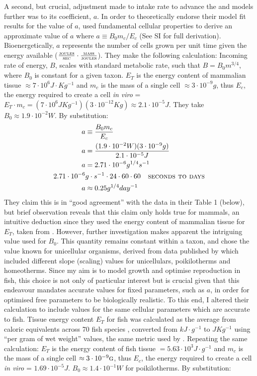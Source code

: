 \documentclass[a4paper]{article} %
\begin{document}
A second, but crucial, adjustment made to intake rate to advance the \cite{West2001} and \cite{Charnov2001} models further was to its coefficient, $a$. In order to theoretically endorse their model fit results for the value of $a$, \cite{West2001} used fundamental cellular properties to derive an approximate value of $a$ where $a \equiv B_{0}m_{c}/E_{c}$ (See SI for full derivation). Bioenergetically, $a$ represents the number of cells grown per unit time given the energy available ($\frac{\textsc{joules}}{\textsc{sec}} \cdot \frac{\textsc{mass}}{\textsc{joules}}$). They make the following calculation: Incoming rate of energy, $B$, scales with standard metabolic rate, such that $B = B_{0}m^{3/4}$, where $B_0$ is constant for a given taxon. $E_T$ is the energy content of mammalian tissue $\approx 7 \cdot 10^6 J \cdot Kg^{-1}$ and $m_c$ is the mass of a single cell $\approx 3 \cdot 10^{-9} g$, thus $E_c$, the energy required to create a cell \textit{in viro} = $E_T \cdot m_c = (7 \cdot 10^6 JKg^{-1})(3 \cdot 10^{-12} Kg) \approx 2.1 \cdot 10^{-5} J$. They take  $B_0 \approx 1.9 \cdot 10^{-2} W$. By substitution:
\begin{align*}
    a &\equiv \frac{B_{0}m_{c}}{E_{c}} \\
    a &= \frac{(1.9 \cdot 10^{-2} W)(3 \cdot 10^{-9} g)}{2.1 \cdot 10^{-5} J}\\
    a &= 2.71 \cdot 10^{-6} g^{1/4}s^{-1} \\
    2.71 \cdot 10^{-6}&g\cdot s^{-1} \cdot 24 \cdot 60 \cdot 60 \ \ \textsc{   seconds to days}\\
    a &\approx 0.25 g^{1/4}day^{-1}
\end{align*}
They claim this is in ``good agreement'' with the data in their Table 1 (below), but brief observation reveals that this claim only holds true for mammals, an intuitive deduction since they used the energy content of mammalian tissue for $E_T$, taken from \cite{peters1983}. However, further investigation makes apparent the intriguing value used for $B_0$. This quantity remains constant within a taxon, and \cite{West2001} chose the value known for unicellular organisms, derived from data published by \cite{Hemmingsen1960} which included different slope (scaling) values for unicellulars, poikilotherms and homeotherms. Since my aim is to model growth and optimise reproduction in fish, this choice is not only of particular interest but is crucial given that this endeavour mandates accurate values for fixed parameters, such as $a$, in order for optimised free parameters to be biologically realistic. To this end, I altered their calculation to include values for the same cellular parameters which are accurate to fish. Tissue energy content $E_T$ for fish was calculated as the average from caloric equivalents across 70 fish species \autocite{Steimle1980}, converted from $kJ\cdot g^{-1}$ to $JKg^{-1}$ using ``per gram of wet weight'' values, the same metric used by \cite{West2001}. Repeating the same calculation: $E_T$ is the energy content of fish tissue $= 5.63 \cdot 10^3 J\cdot g^{-1}$ and $m_c$ is the mass of a single cell $\approx 3 \cdot 10^{-9} \textsc{g}$, thus $E_c$, the energy required to create a cell \textit{in viro} = $1.69 \cdot 10^{-5} J$. $B_0 \approx 1.4 \cdot 10^{-1} W$ for poikilotherms. By substitution:
\end{document}
